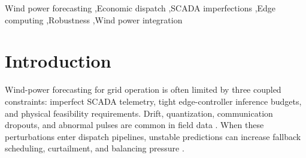 \documentclass[review,1p,times]{elsarticle}
\begin{document}
\begin{frontmatter}
\begin{abstract}
In this study on Wind (CN), we examine forecasting under corrupted SCADA telemetry with batch-1 edge limits on latency and memory, and observe that clean-benchmark ranking can break down in dispatch-coupled operation on Wind (CN). We propose Ultra-LSNT, a sparse MoE forecaster, together with FG-MoE, a feasibility guard that suppresses physically invalid outputs during corrupted-input inference with minimal additional overhead in batch-1 deployment settings. On Wind CN, Ultra-LSNT retains positive skill in the severe Gaussian slice used in this study, with $\sigma_{\mathrm{eff}}=0.60$ and $R^2=0.7263$, and FG-MoE reduces over-rated violations from 0.0550\% to 0.0092\% against a matched no-guardrail backbone. Under a fixed affine mapped-dispatch protocol, Ultra-LSNT lowers L1 operating cost and fallback frequency versus DLinear, with cost reduction $-33.96\%$ and fallback days reduced from $75$ to $29$; ranking remains interface-sensitive, with mean Spearman $=0.60$ and Top-1 consistency $=0$, indicating that dispatch value depends on the forecast-to-grid interface rather than on point-forecast ranking alone.
\end{abstract}





\begin{keyword}
Wind power forecasting \sep Economic dispatch \sep SCADA imperfections \sep Edge computing \sep Robustness \sep Wind power integration
\end{keyword}

\end{frontmatter}

\linenumbers

\section{Introduction}
\label{sec:intro}

Wind-power forecasting for grid operation is often limited by three coupled constraints: imperfect SCADA telemetry, tight edge-controller inference budgets, and physical feasibility requirements. Drift, quantization, communication dropouts, and abnormal pulses are common in field data \citep{ren2020scada,letzgus2020,vervlimmeren2025scalable,martincalzada2025optimized}. When these perturbations enter dispatch pipelines, unstable predictions can increase fallback scheduling, curtailment, and balancing pressure \citep{khaloie2020coordinated,larrahondo2021acdcomp,li2024opf_highren}.
\end{document}

